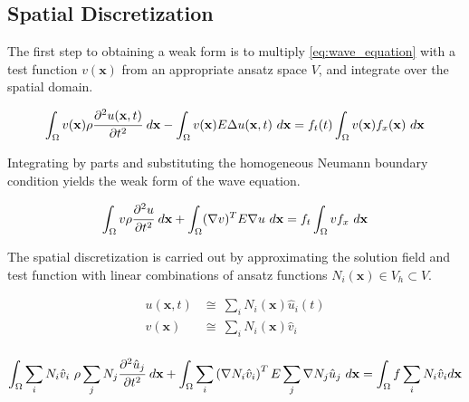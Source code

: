 \subsection{Spatial Discretization}
\label{subsection:wave_equation_spatial_discretization}

The first step to obtaining a weak form is to multiply \ref{eq:wave_equation} with a test function $v(\mathbf x)$ from an appropriate ansatz space $V$, and integrate over the spatial domain.

\begin{equation}
	\int_{\Omega} v(\mathbf x) \rho \cfrac{\partial^2 u(\mathbf x, t)}{\partial t^2} \ d \mathbf x
	-
	\int_{\Omega} v(\mathbf x) E \Delta u(\mathbf x, t) \ d \mathbf x
	=
	f_t(t) \int_{\Omega} v(\mathbf x) f_x(\mathbf x) \ d \mathbf x
\end{equation}

Integrating by parts and substituting the homogeneous Neumann boundary condition yields the weak form of the wave equation.

\begin{equation} \label{eq:wave_equation_weak_form}
	\int_{\Omega} v \rho \cfrac{\partial^2 u}{\partial t^2} \ d \mathbf x
	+
	\int_{\Omega} (\nabla v)^T E \nabla u \ d \mathbf x
	=
	f_t \int_{\Omega} v f_x \ d \mathbf x
\end{equation}

The spatial discretization is carried out by approximating the solution field and test function with linear combinations of ansatz functions $N_i(\mathbf x) \in V_h \subset V$.

\begin{equation}
	\begin{array}{rl}
		u(\mathbf x, t) &\cong \ \sum_i N_i(\mathbf x) \hat u_i(t) \\
		v(\mathbf x) &\cong \ \sum_i N_i(\mathbf x) \hat v_i \\
	\end{array}
\end{equation}

\begin{equation} \label{eq:wave_equation_spatially_discretized_test}
	\int_{\Omega} \sum_i N_i \hat v_i \ \rho \sum_j N_j \cfrac{\partial^2 \hat u_j}{\partial t^2} \ d \mathbf x
	+
	\int_{\Omega} \sum_i \left( \nabla N_i \hat v_i \right)^T E \sum_j \nabla N_j \hat u_j \ d \mathbf x
	=
	\int_{\Omega} f \sum_i N_i \hat v_i d \mathbf x
\end{equation}

